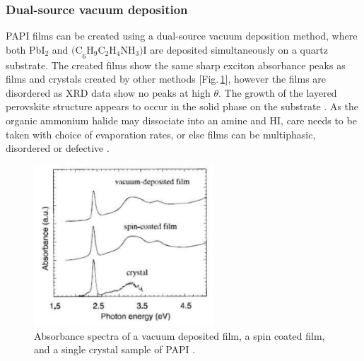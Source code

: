 \subsubsection{Dual-source vacuum deposition}
PAPI films can be created using a dual-source vacuum deposition method, where both Pb$\textrm{I}_2$ and $\textrm{(C}_6\textrm{H}_9\textrm{C}_2\textrm{H}_4\textrm{NH}_3)\textrm{I}$ are deposited simultaneously on a quartz substrate. The created films show the same sharp exciton absorbance peaks as films and crystals created by other methods [Fig.\,\ref{2Fig8}], however the films are disordered as XRD data show no peaks at high $\theta$. The growth of the layered perovskite structure appears to occur in the solid phase on the substrate \cite{Era1997}. As the organic ammonium halide may dissociate into an amine and HI, care needs to be taken with choice of evaporation rates, or else films can be multiphasic, disordered or defective \cite{Mitzi1999}.
\begin{figure}[h!]
\centering
\includegraphics[width=0.6\textwidth]{Fig8}
\caption{Absorbance spectra of a vacuum deposited film, a spin coated film, and a single crystal sample of PAPI \cite{Era1997}.}
\label{2Fig8}
\end{figure}

